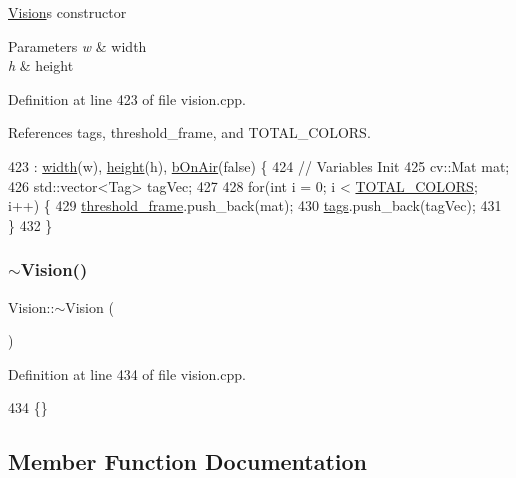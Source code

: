 \hyperlink{class_vision}{Vision}\textquotesingle{}s constructor 
\begin{DoxyParams}{Parameters}
{\em w} & width \\
\hline
{\em h} & height \\
\hline
\end{DoxyParams}


Definition at line 423 of file vision.\+cpp.



References tags, threshold\+\_\+frame, and T\+O\+T\+A\+L\+\_\+\+C\+O\+L\+O\+RS.


\begin{DoxyCode}
423                            : \hyperlink{class_vision_ac82a1da77a8b08d112e5c4688bd70c3d}{width}(w), \hyperlink{class_vision_aa6f52191ab439505b6156835594f1861}{height}(h), \hyperlink{class_vision_a1eb56f5e3433ca3dce53fe315b845979}{bOnAir}(\textcolor{keyword}{false}) \{
424     \textcolor{comment}{// Variables Init}
425     cv::Mat mat;
426     std::vector<Tag> tagVec;
427 
428     \textcolor{keywordflow}{for}(\textcolor{keywordtype}{int} i = 0; i < \hyperlink{class_vision_a9fbea649a805b17ad9ea18f3f06c14f2}{TOTAL\_COLORS}; i++) \{
429         \hyperlink{class_vision_a2fee2db2d4fe0cee6b2de36ee0eb6c7f}{threshold\_frame}.push\_back(mat);
430         \hyperlink{class_vision_acc5bbdf18ba36cc516c17999308be267}{tags}.push\_back(tagVec);
431     \}
432 \}
\end{DoxyCode}
\mbox{\label{class_vision_a12bc039b4fcdb229e70c55d2660392a8}} 
\subsubsection{\texorpdfstring{$\sim$\+Vision()}{~Vision()}}
{\footnotesize\ttfamily Vision\+::$\sim$\+Vision (\begin{DoxyParamCaption}{ }\end{DoxyParamCaption})}



Definition at line 434 of file vision.\+cpp.


\begin{DoxyCode}
434 \{\}
\end{DoxyCode}


\subsection{Member Function Documentation}
\mbox{\label{class_vision_a4f6f281bd1aaacad29c9e48f4d8fb1b9}} 
